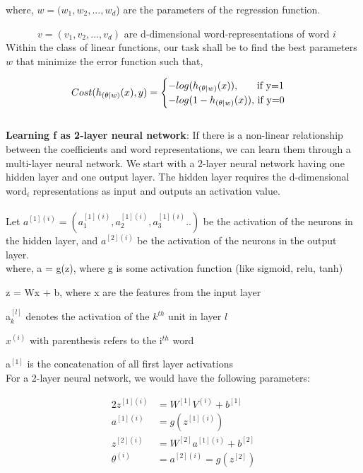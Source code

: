 where, $w = (w_{1}, w_{2}, ..., w_{d}$) are the parameters of the regression function. 

$\quad\qquad\  v= (v_{1}, v_{2}, ..., v_{d})$ are d-dimensional word-representations of word $i$\\

Within the class of linear functions, our task shall be to find the best parameters $w$ that minimize the error function such that,

\begin{equation}\label{cost_fn_eq}
Cost(h_{(\theta| w)}(x), y) = 
\begin{cases}
-log(h_{(\theta| w)}(x)), $\qquad if y=1$
\\
-log(1-h_{(\theta| w)}(x)), $ if y=0$
\end{cases}
\end{equation}\\
\noindent\textbf{Learning f as 2-layer neural network}: If there is a non-linear relationship between the coefficients and word representations, we can learn them through a multi-layer neural network. We start with a 2-layer neural network having one hidden layer and one output layer. The hidden layer requires the d-dimensional word$_{i}$ representations as input and outputs an activation value.\\\\ Let $a^{[1](i)} = (a^{[1](i)}_{1},a^{[1](i)}_{2},a^{[1](i)}_{3}..)$ be the activation of the neurons in the hidden layer, and $a^{[2](i)}$ be the activation of the neurons in the output layer.\\

\noindent where, a = g(z), where g is some activation function (like sigmoid, relu, tanh)

\quad\quad z = Wx + b, where x are the features from the input layer

\quad\quad a$^{[l]}_{k}$ denotes the activation of the $k^{th}$ unit in layer $l$

\quad\quad $x^{(i)}$ with parenthesis refers to the i$^{th}$ word

\quad\quad a$^{[1]}$ is the concatenation of all first layer activations\\

\noindent For a 2-layer neural network, we would have the following parameters:

\begin{alignat}{2}
z^{[1](i)} & = W^{[1]}V^{(i)} + b^{[1]}\\
a^{[1](i)} & = g(z^{[1](i)})\\
z^{[2](i)} & = W^{[2]}a^{[1](i)} + b^{[2]}\\
\theta^{(i)} & = a^{[2](i)} = g(z^{[2]})
\end{alignat}

